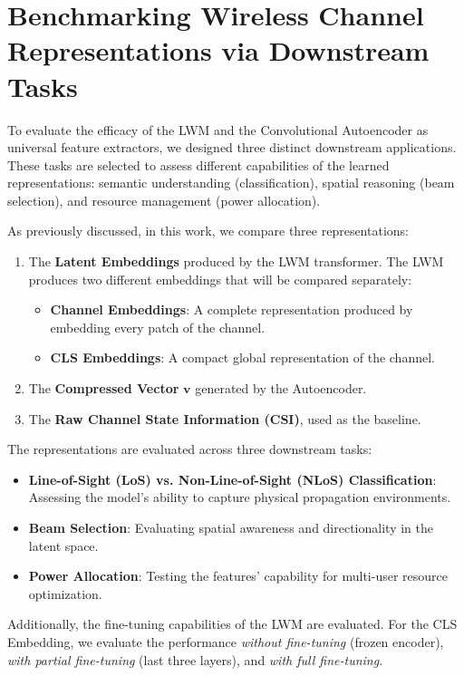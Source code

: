 \chapter{Benchmarking Wireless Channel Representations via Downstream Tasks}\label{sec:tasks}

To evaluate the efficacy of the LWM and the Convolutional Autoencoder as universal feature extractors, we designed three distinct downstream applications. These tasks are selected to assess different capabilities of the learned representations: semantic understanding (classification), spatial reasoning (beam selection), and resource management (power allocation).

As previously discussed, in this work, we compare three representations:
\begin{enumerate}
    \item The \textbf{Latent Embeddings} produced by the LWM transformer. The LWM produces two different embeddings that will be compared separately:
    \begin{itemize}
        \item \textbf{Channel Embeddings}: A complete representation produced by embedding every patch of the channel.
        \item \textbf{CLS Embeddings}: A compact global representation of the channel.
    \end{itemize}
    \item The \textbf{Compressed Vector} $\mathbf{v}$ generated by the Autoencoder.
    \item The \textbf{Raw Channel State Information (CSI)}, used as the baseline.
\end{enumerate}

The representations are evaluated across three downstream tasks:
\begin{itemize}
    \item \textbf{Line-of-Sight (LoS) vs. Non-Line-of-Sight (NLoS) Classification}: Assessing the model's ability to capture physical propagation environments.
    \item \textbf{Beam Selection}: Evaluating spatial awareness and directionality in the latent space.
    \item \textbf{Power Allocation}: Testing the features' capability for multi-user resource optimization.
\end{itemize}

Additionally, the fine-tuning capabilities of the LWM are evaluated. For the CLS Embedding, we evaluate the performance \textit{without fine-tuning} (frozen encoder), \textit{with partial fine-tuning} (last three layers), and \textit{with full fine-tuning}.

